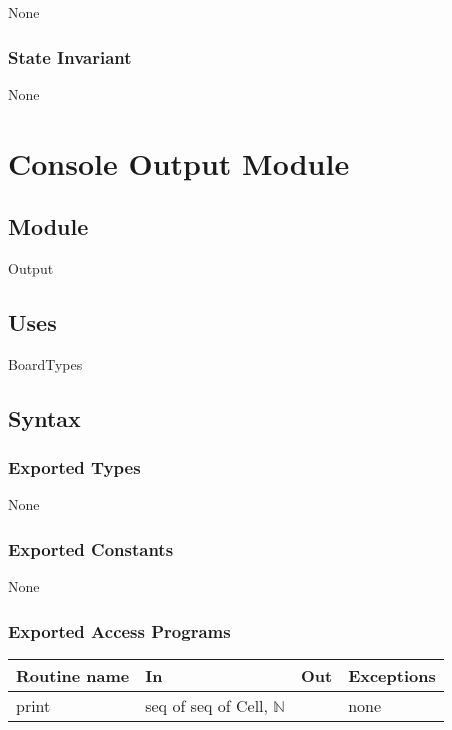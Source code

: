 \documentclass[12pt]{article}
\begin{document}
None

\subsubsection* {State Invariant}

None

\newpage

\section* {Console Output Module}

\subsection* {Module}

Output

\subsection* {Uses}

BoardTypes

\subsection* {Syntax}

\subsubsection* {Exported Types}

None

\subsubsection* {Exported Constants}

None

\subsubsection* {Exported Access Programs}

\begin{tabular}{| l | l | l | p{5cm} |}
\hline
\textbf{Routine name} & \textbf{In} & \textbf{Out} & \textbf{Exceptions}\\
\hline
print & seq of seq of Cell, $\mathbb{N}$ &  & none\\
\hline

\end{tabular}
\end{document}
